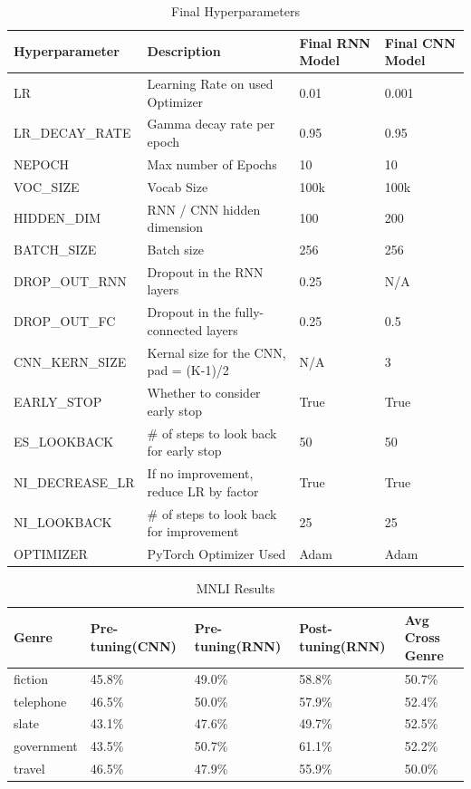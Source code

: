 \documentclass[a4paper,10pt]{article}
\begin{document}
\begin{table}[!htbp]
\begin{tabular}{| l | l | l | l |}
\hline
Hyperparameter   & Description                                & Final RNN Model     & Final CNN Model \\
\hline
LR               & Learning Rate on used Optimizer            & 0.01      & 0.001     \\
LR\_DECAY\_RATE  & Gamma decay rate per epoch                 & 0.95      & 0.95      \\
NEPOCH           & Max number of Epochs                       & 10        & 10      \\
VOC\_SIZE        & Vocab Size                                 & 100k      & 100k     \\
HIDDEN\_DIM      & RNN / CNN hidden dimension                 & 100       & 200   \\
BATCH\_SIZE      & Batch size                                 & 256       & 256   \\
DROP\_OUT\_RNN   & Dropout in the RNN layers                  & 0.25      & N/A   \\
DROP\_OUT\_FC    & Dropout in the fully-connected layers      & 0.25      & 0.5   \\
CNN\_KERN\_SIZE  & Kernal size for the CNN, pad = (K-1)/2     & N/A       & 3      \\
EARLY\_STOP      & Whether to consider early stop             & True      & True     \\
ES\_LOOKBACK     & \# of steps to look back for early stop    & 50        & 50     \\
NI\_DECREASE\_LR & If no improvement, reduce LR by factor     & True      & True     \\
NI\_LOOKBACK     & \# of steps to look back for improvement   & 25        & 25     \\
OPTIMIZER        & PyTorch Optimizer Used                     & Adam      & Adam     \\
\hline
\end{tabular}
\caption{Final Hyperparameters}\label{tbl:finalhparams}
\end{table}


\begin{table}[!htbp]
\begin{tabular}{| l | l | l | l | l |}
\hline
Genre      & Pre-tuning(CNN) & Pre-tuning(RNN) & Post-tuning(RNN) & Avg Cross Genre \\
\hline
fiction    & 45.8\%   & 49.0\%   & 58.8\%   & 50.7\%    \\
\hline
telephone  & 46.5\%   & 50.0\%   & 57.9\%   & 52.4\%    \\
\hline
slate      & 43.1\%   & 47.6\%   & 49.7\%   & 52.5\%    \\
\hline
government & 43.5\%   & 50.7\%   & 61.1\%   & 52.2\%    \\
\hline
travel     & 46.5\%   & 47.9\%   & 55.9\%   & 50.0\%    \\
\hline
\end{tabular}
\caption{MNLI Results}\label{tbl:mnliresults}
\end{table}
\end{document}
